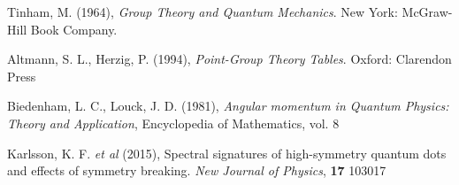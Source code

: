 \documentclass[12pt]{article}
\begin{document}
\begin{thebibliography}{10}

Tinham, M. (1964), \textit{Group Theory and Quantum Mechanics}. New York: McGraw-Hill Book Company.

Altmann, S. L., Herzig, P. (1994), \textit{Point-Group Theory Tables}. Oxford: Clarendon Press

Biedenham, L. C., Louck, J. D. (1981), \textit{Angular momentum in Quantum Physics: Theory and Application}, Encyclopedia of Mathematics, vol. 8

Karlsson, K. F. \textit{et al} (2015), Spectral signatures of high-symmetry quantum dots and effects of symmetry breaking. \textit{New Journal of Physics}, \textbf{17} 103017


\end{thebibliography}	
	
\end{document}
